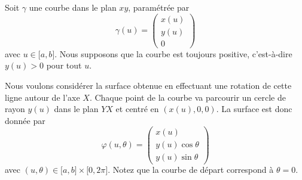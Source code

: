 Soit \( \gamma\) une courbe dans le plan \( xy\), paramétrée par
\begin{equation}
	\gamma(u)=\begin{pmatrix}
		x(u) \\
		y(u) \\
		0
	\end{pmatrix}
\end{equation}
avec \( u\in\mathopen[ a , b \mathclose]\). Nous supposons que la courbe est toujours positive, c'est-à-dire \( y(u)>0\) pour tout \( u\).

Nous voulons considérer la surface obtenue en effectuant une rotation de cette ligne autour de l'axe \( X\). Chaque point de la courbe va parcourir un cercle de rayon \( y(u)\) dans le plan \( YX\) et centré en \( (x(u),0,0)\). La surface est donc donnée par
\begin{equation}
	\varphi(u,\theta)=\begin{pmatrix}
		x(u)           \\
		y(u)\cos\theta \\
		y(u)\sin\theta
	\end{pmatrix}
\end{equation}
avec \( (u,\theta)\in\mathopen[ a , b \mathclose]\times \mathopen[ 0 , 2\pi \mathclose]\). Notez que la courbe de départ correspond à \( \theta=0\).


